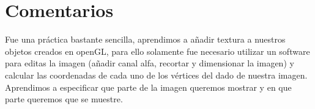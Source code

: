 \documentclass[12pt, a4paper]{article}
\begin{document}
\section{Comentarios}
\justify
Fue una práctica bastante sencilla, aprendimos a añadir textura a nuestros objetos creados en openGL, para ello solamente fue necesario utilizar un software para editas la imagen (añadir canal alfa, recortar y dimensionar la imagen) y calcular las coordenadas de cada uno de los vértices del dado de nuestra imagen.\\ [.3cm]
Aprendimos a especificar que parte de la imagen queremos mostrar y en que parte queremos que se muestre.\\[.3cm]
\end{document}
